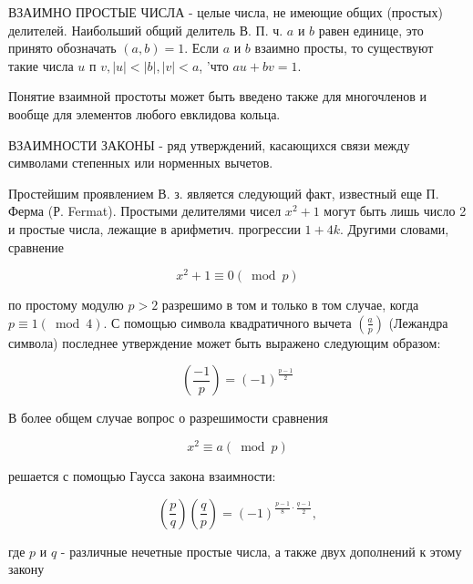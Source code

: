\documentclass[10pt]{article}
\begin{document}
ВЗАИМНО ПРОСТЫЕ ЧИСЛА - целые числа, не имеющие общих (простых) делителей. Наибольший общий делитель В. П. ч. $a$ и $b$ равен единице, это принято обозначать $(a, b)=1$. Если $a$ и $b$ взаимно просты, то существуют такие числа $u$ п $v,|u|<|b|,|v|<a$, 'что $a u+b v=1$.



Понятие взаимной простоты может быть введено также для многочленов и вообще для элементов любого евклидова кольца.



ВЗАИМНОСТИ ЗАКОНЫ - ряд утверждений, касающихся связи между символами степенных или норменных вычетов.



Простейшим проявлением В. з. является следующий факт, известный еще П. Ферма (Р. Fermat). Простыми делителями чисел $x^{2}+1$ могут быть лишь число 2 и простые числа, лежащие в арифметич. прогрессии $1+4 k$. Другими словами, сравнение



\[

x^{2}+1 \equiv 0(\bmod p)

\]



по простому модулю $p>2$ разрешимо в том и только в том случае, когда $p \equiv 1(\bmod 4)$. С помощью символа квадратичного вычета $\left(\frac{a}{p}\right)$ (Лежандра символа) последнее утверждение может быть выражено следующим образом:



\[

\left(\frac{-1}{p}\right)=(-1)^{\frac{p-1}{2}}

\]



В более общем случае вопрос о разрешимости сравнения



\[

x^{2} \equiv a(\bmod p)

\]



решается с помощью Гаусса закона взаимности:



\[

\left(\frac{p}{q}\right)\left(\frac{q}{p}\right)=(-1)^{\frac{p-1}{8} \cdot \frac{q-1}{2}},

\]



где $p$ и $q$ - различные нечетные простые числа, а также двух дополнений к этому закону
\end{document}
